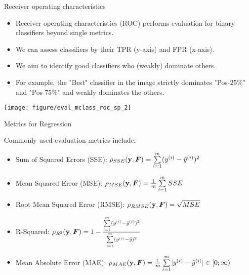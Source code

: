 \documentclass[11pt,compress,t,notes=noshow, xcolor=table]{beamer}
\begin{document}
\begin{vbframe}{Receiver operating characteristics}

\begin{itemize}
\item Receiver operating characteristics (ROC) performs evaluation for binary classifiers beyond single metrics.
\item We can assess classifiers by their TPR (y-axis) and FPR (x-axis).
\item We aim to identify good classifiers who (weakly) dominate others. 
\item For example, the "Best" classifier in the image strictly dominates "Pos-25\%" and "Pos-75\%" and weakly dominates the others.
\end{itemize}
\begin{center}
    {\centering \texttt{[image: figure/eval\_mclass\_roc\_sp\_2]}}
    \end{center}


\end{vbframe}


\begin{vbframe}{Metrics for Regression}

Commonly used evaluation metrics include:
\begin{itemize}
\item Sum of Squared Errors (SSE): $\rho_{SSE}(\mathbf{y}, \bm{F})=\sum\limits_{i=1}^m (y^{(i)}- \hat{y}^{(i)})^2$
\item Mean Squared Error (MSE): $\rho_{MSE}(\mathbf{y}, \bm{F})=\frac{1}{m} \sum\limits_{i=1}^m SSE$
\item Root Mean Squared Error (RMSE): $\rho_{RMSE}(\mathbf{y}, \bm{F})= \sqrt{MSE}$
\item R-Squared: $\rho_{R^2}(\mathbf{y}, \bm{F}) = 1 - \frac{\sum\limits_{i=1}^m (y^{(i)}- \hat{y}^{(i)})^2}{\sum\limits_{i=1}^m (y^{(i)} - \bar{y})^2}$
\item Mean Absolute Error (MAE): $\rho_{MAE}(\mathbf{y}, \bm{F}) = \frac{1}{m} \sum\limits_{i=1}^m \rvert y^{(i)}- \hat{y}^{(i)} \rvert \in [0;\infty) \qquad$
\end{itemize}

\end{vbframe}
\end{document}
